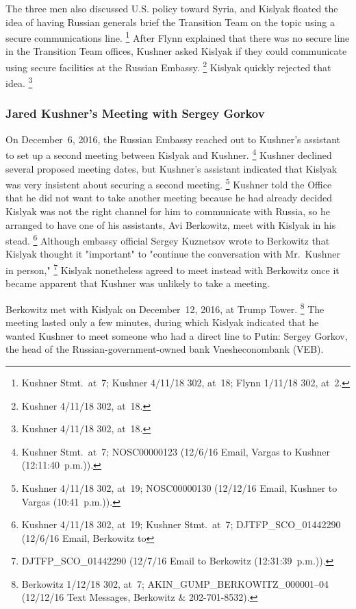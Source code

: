 The three men also discussed U.S. policy toward Syria, and Kislyak floated the idea of having Russian generals brief the Transition Team on the topic using a secure communications line.%
\footnote{Kushner Stmt.\ at~7;
Kushner 4/11/18 302, at~18;
Flynn 1/11/18 302, at~2.}
After Flynn explained that there was no secure line in the Transition Team offices, Kushner asked Kislyak if they could communicate using secure facilities at the Russian Embassy.%
\footnote{Kushner 4/11/18 302, at~18.}
Kislyak quickly rejected that idea.%
\footnote{Kushner 4/11/18 302, at~18.}

\subsubsection{Jared Kushner's Meeting with Sergey Gorkov}

On December~6, 2016, the Russian Embassy reached out to Kushner's assistant to set up a second meeting between Kislyak and Kushner.%
\footnote{Kushner Stmt.\ at~7;
NOSC00000123 (12/6/16 Email, Vargas to Kushner (12:11:40~p.m.)).}
Kushner declined several proposed meeting dates, but Kushner's assistant indicated that Kislyak was very insistent about securing a second meeting.%
\footnote{Kushner 4/11/18 302, at~19;
NOSC00000130 (12/12/16 Email, Kushner to Vargas (10:41~p.m.)).}
Kushner told the Office that he did not want to take another meeting because he had already decided Kislyak was not the right channel for him to communicate with Russia, so he arranged to have one of his assistants, Avi Berkowitz, meet with Kislyak in his stead.%
\footnote{Kushner 4/11/18 302, at~19;
Kushner Stmt.\ at~7;
DJTFP\_SCO\_01442290 (12/6/16 Email, Berkowitz to }
Although embassy official Sergey Kuznetsov wrote to Berkowitz that Kislyak thought it "important" to "continue the conversation with Mr.~Kushner in person,"%
\footnote{DJTFP\_SCO\_01442290 (12/7/16 Email  to Berkowitz (12:31:39~p.m.)).}
Kislyak nonetheless agreed to meet instead with Berkowitz once it became apparent that Kushner was unlikely to take a meeting.

Berkowitz met with Kislyak on December~12, 2016, at Trump Tower.%
\footnote{Berkowitz 1/12/18 302, at~7;
AKIN\_GUMP\_BERKOWITZ\_000001--04 (12/12/16 Text Messages, Berkowitz \& 202-701-8532).}
The meeting lasted only a few minutes, during which Kislyak indicated that he wanted Kushner to meet someone who had a direct line to Putin: Sergey Gorkov, the head of the Russian-government-owned bank Vnesheconombank (VEB).

